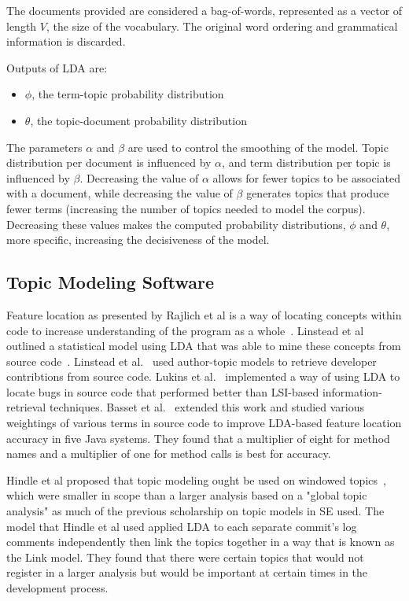 The documents provided are considered a bag-of-words,
represented as a vector of length $V\!$, the size of the vocabulary.
The original word ordering and grammatical information is discarded.

Outputs of LDA are:
\begin{itemize}
\setlength{\itemsep}{1pt}
\item $\phi$, the term-topic probability distribution
\item $\theta$, the topic-document probability distribution
\end{itemize}

The parameters $\alpha$ and $\beta$ are used to control the smoothing of the model.
Topic distribution per document is influenced by $\alpha$,
and term distribution per topic is influenced by $\beta$.
Decreasing the value of $\alpha$ allows for fewer topics to be associated with a document,
while decreasing the value of $\beta$ generates topics that produce fewer terms
(increasing the number of topics needed to model the corpus).
Decreasing these values makes the computed probability distributions, $\phi$ and $\theta$,
more specific, increasing the decisiveness of the model.

\subsection{Topic Modeling Software}

Feature location as presented by Rajlich et al
is a way of locating concepts within code to increase understanding of the program as a whole~\cite{Rajlich-Wilde:2002}.
Linstead et al outlined a statistical model using LDA that was able to mine these concepts from source code~\cite{Linstead-etal:2007b}.
Linstead et al.~\cite{Linstead-etal:2007} used author-topic models to retrieve
developer contribtions from source code.
Lukins et al.~\cite{Lukins-etal:2008} implemented a way of using LDA to locate bugs in source
code that performed better than LSI-based information-retrieval
techniques.
Basset et al.~\cite{Bassett-Kraft:2013} extended this work
and studied various weightings of various terms in source code
to improve LDA-based feature location accuracy in five Java systems.
They found that a multiplier of eight for method names and a multiplier
of one for method calls is best for accuracy.

Hindle et al proposed that topic modeling ought be used on windowed topics~\cite{Hindle-etal:2009}, which were smaller in scope than a larger analysis based on a "global topic analysis" as much of the previous scholarship on topic models in SE used.
The model that Hindle et al used applied LDA to each separate commit's log comments independently then link the topics together in a way that is known as the Link model.
They found that there were certain topics that would not register in a larger analysis but would be important at certain times in the development process.

